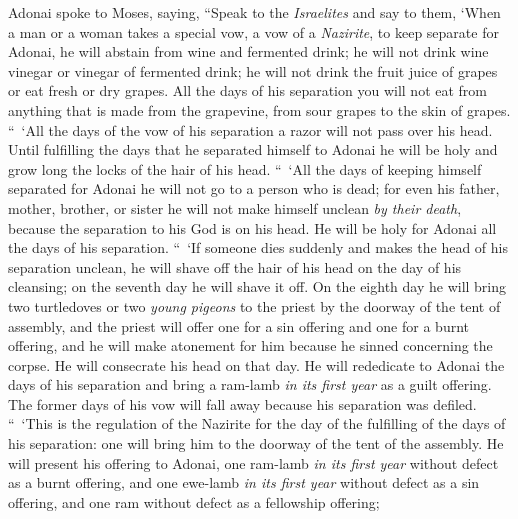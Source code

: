 \begin{biblechapter} %
 Adonai spoke to Moses, saying,
\verse “Speak to the \textit{Israelites} and say to them, ‘When a man or a woman takes a special vow, a vow of a \textit{Nazirite}, to keep separate for Adonai,
\verse he will abstain from wine and fermented drink; he will not drink wine vinegar or vinegar of fermented drink; he will not drink the fruit juice of grapes or eat fresh or dry grapes.
\verse All the days of his separation you will not eat from anything that is made from the grapevine, from sour grapes to the skin of grapes.
\verse “ ‘All the days of the vow of his separation a razor will not pass over his head. Until fulfilling the days that he separated himself to Adonai he will be holy and grow long the locks of the hair of his head.
\verse “ ‘All the days of keeping himself separated for Adonai he will not go to a person who is dead;
\verse for even his father, mother, brother, or sister he will not make himself unclean \textit{by their death}, because the separation to his God is on his head.
\verse He will be holy for Adonai all the days of his separation.
\verse “ ‘If someone dies suddenly and makes the head of his separation unclean, he will shave off the hair of his head on the day of his cleansing; on the seventh day he will shave it off.
\verse On the eighth day he will bring two turtledoves or two \textit{young pigeons} to the priest by the doorway of the tent of assembly,
\verse and the priest will offer one for a sin offering and one for a burnt offering, and he will make atonement for him because he sinned concerning the corpse. He will consecrate his head on that day.
\verse He will rededicate to Adonai the days of his separation and bring a ram-lamb \textit{in its first year} as a guilt offering. The former days of his vow will fall away because his separation was defiled.
\verse “ ‘This is the regulation of the Nazirite for the day of the fulfilling of the days of his separation: one will bring him to the doorway of the tent of the assembly.
\verse He will present his offering to Adonai, one ram-lamb \textit{in its first year} without defect as a burnt offering, and one ewe-lamb \textit{in its first year} without defect as a sin offering, and one ram without defect as a fellowship offering;

\end{biblechapter}
